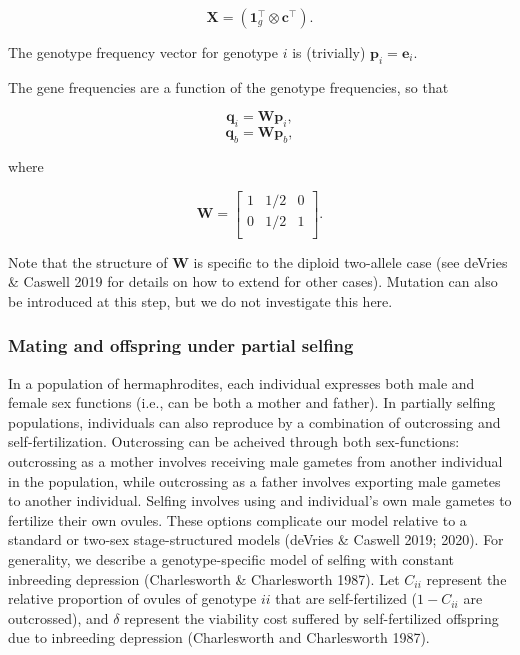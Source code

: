 \documentclass[11pt]{article}
\def\mbf#1{\mathbf{#1}}
\begin{document}
\begin{equation}
	\mbf{X} = (\mbf{1}_g^\intercal \otimes \mbf{c}^\intercal).
\end{equation}

\noindent The genotype frequency vector for genotype $i$ is (trivially) $\mbf{p}_i = \mbf{e}_i$.

The gene frequencies are a function of the genotype frequencies, so that

\begin{equation}
		\mbf{q}_i = \mbf{W} \mbf{p}_i,
\end{equation}
\begin{equation}
		\mbf{q}_b = \mbf{W} \mbf{p}_b,
\end{equation}

\noindent where

\begin{equation}
		\mbf{W} = \left[
						\begin{array}{ccc}
							1 & 1/2 & 0 \\
							0 & 1/2 & 1 \\
						\end{array} \right].
\end{equation}

\noindent Note that the structure of $\mbf{W}$ is specific to the diploid two-allele case (see deVries \& Caswell 2019 for details on how to extend for other cases). Mutation can also be introduced at this step, but we do not investigate this here.

\subsubsection*{Mating and offspring under partial selfing}

In a population of hermaphrodites, each individual expresses both male and female sex functions (i.e., can be both a mother and father). In partially selfing populations, individuals can also reproduce by a combination of outcrossing and self-fertilization. Outcrossing can be acheived through both sex-functions: outcrossing as a mother involves receiving male gametes from another individual in the population, while outcrossing as a father involves exporting male gametes to another individual. Selfing involves using and individual's own male gametes to fertilize their own ovules. These options complicate our model relative to a standard or two-sex stage-structured models (deVries \& Caswell 2019; 2020). For generality, we describe a genotype-specific model of selfing with constant inbreeding depression (Charlesworth \& Charlesworth 1987). Let $C_{ii}$ represent the relative proportion of ovules of genotype $ii$ that are self-fertilized ($1 - C_{ii}$ are outcrossed), and $\delta$ represent the viability cost suffered by self-fertilized offspring due to inbreeding depression (Charlesworth and Charlesworth 1987).
\end{document}
